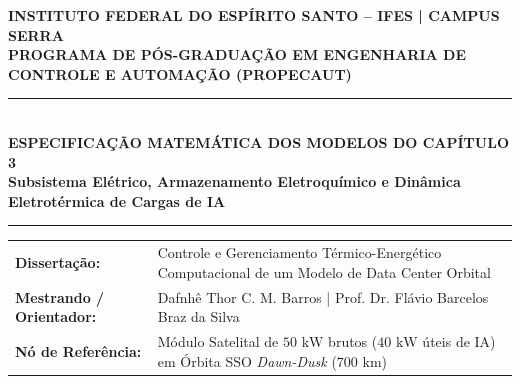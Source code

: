 \documentclass[11pt,a4paper]{article}
\begin{document}
\begin{center}
    {\small\textbf{INSTITUTO FEDERAL DO ESPÍRITO SANTO -- IFES | CAMPUS SERRA}}\\[2pt]
    {\small\textbf{PROGRAMA DE PÓS-GRADUAÇÃO EM ENGENHARIA DE CONTROLE E AUTOMAÇÃO (PROPECAUT)}}\\[4pt]
    \rule{\textwidth}{1.2pt}\\[5pt]
    {\large\textbf{\color{ifesgreen}ESPECIFICAÇÃO MATEMÁTICA DOS MODELOS DO CAPÍTULO 3}}\\[2pt]
    {\small\textbf{Subsistema Elétrico, Armazenamento Eletroquímico e Dinâmica Eletrotérmica de Cargas de IA}}\\[4pt]
    \rule{\textwidth}{0.6pt}
\end{center}

\vspace{-6pt}
\begin{center}
    \small
    \begin{tabularx}{\textwidth}{lX}
        \textbf{Dissertação:} & Controle e Gerenciamento Térmico-Energético Computacional de um Modelo de Data Center Orbital \\
        \textbf{Mestrando / Orientador:} & Dafnhê Thor C. M. Barros \;|\; Prof. Dr. Flávio Barcelos Braz da Silva \\
        \textbf{Nó de Referência:} & Módulo Satelital de $50\text{ kW}$ brutos ($40\text{ kW}$ úteis de IA) em Órbita SSO \textit{Dawn-Dusk} ($700\text{ km}$)
    \end{tabularx}
\end{center}

\vspace{2pt}
\end{document}
